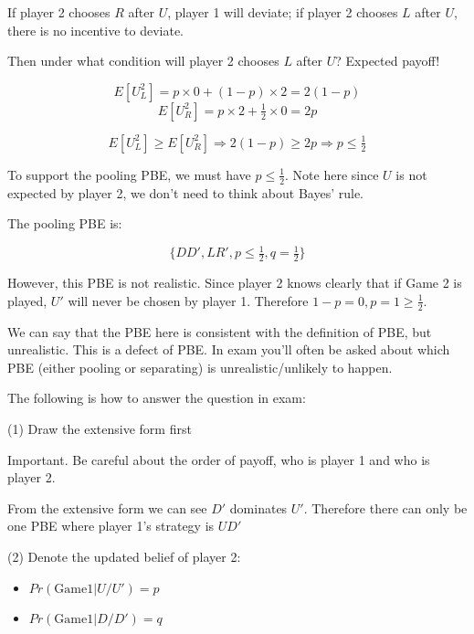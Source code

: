 \documentclass{article}
\begin{document}
\begin{mdframed}[backgroundcolor=blue!20,linecolor=white]
\medskip

If player 2 chooses $R$ after $U$, player 1 will deviate; if player 2 chooses $L$ after $U$, there is no incentive to deviate.

\medskip

Then under what condition will player 2 chooses $L$ after $U$? Expected payoff!

$$E[U^2_{L}] = p \times 0+ (1-p)\times 2 = 2(1-p)$$
$$E[U^2_{R}] = p \times 2+ \tfrac12 \times 0 = 2p$$

$$E[U^2_{L}] \ge E[U^2_{R}] \Rightarrow 2(1-p) \ge 2p \Rightarrow p \le \tfrac12$$

To support the pooling PBE, we must have $p \le \tfrac12$.
Note here since $U$ is not expected by player 2, we don't need to think about Bayes' rule.

\medskip

The pooling PBE is:

$$\{DD', LR', p \le \tfrac12, q = \tfrac12\}$$

However, this PBE is not realistic. Since player 2 knows clearly that if Game 2 is played, $U'$ will never be chosen by player 1. Therefore $1-p = 0, p =1 \ge \tfrac12$.

\medskip

We can say that the PBE here is consistent with the definition of PBE, but unrealistic. This is a defect of PBE. In exam you'll often be asked about which PBE (either pooling or separating) is unrealistic/unlikely to happen.

\medskip

The following is how to answer the question in exam:
\end{mdframed}


(1) Draw the extensive form first

\begin{mdframed}[backgroundcolor=yellow!20,linecolor=white]
Important. Be careful about the order of payoff, who is player 1 and who is player 2.
\end{mdframed}

From the extensive form we can see $D'$ dominates $U'$.
Therefore there can only be one PBE where player 1's strategy is $UD'$

(2) Denote the updated belief of player 2:
\begin{itemize}
\item $Pr(\text{Game1} | U/U') = p$
\item $Pr(\text{Game1} | D/D') = q$
\end{itemize}
\end{document}
